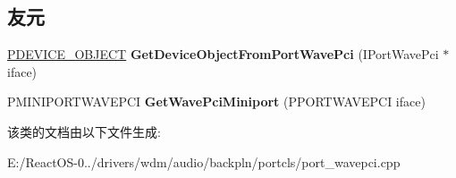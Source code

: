 \subsection*{友元}
\begin{DoxyCompactItemize}
\item 
\mbox{\label{class_c_port_wave_pci_a4c05a9662b97184ddff86121e26274e5}} 
\hyperlink{struct___d_e_v_i_c_e___o_b_j_e_c_t}{P\+D\+E\+V\+I\+C\+E\+\_\+\+O\+B\+J\+E\+CT} {\bfseries Get\+Device\+Object\+From\+Port\+Wave\+Pci} (I\+Port\+Wave\+Pci $\ast$iface)
\item 
\mbox{\label{class_c_port_wave_pci_ae65f603984062cd4a1873e0ca347ab36}} 
P\+M\+I\+N\+I\+P\+O\+R\+T\+W\+A\+V\+E\+P\+CI {\bfseries Get\+Wave\+Pci\+Miniport} (P\+P\+O\+R\+T\+W\+A\+V\+E\+P\+CI iface)
\end{DoxyCompactItemize}


该类的文档由以下文件生成\+:\begin{DoxyCompactItemize}
\item 
E\+:/\+React\+O\+S-\/0../drivers/wdm/audio/backpln/portcls/port\+\_\+wavepci.\+cpp\end{DoxyCompactItemize}

